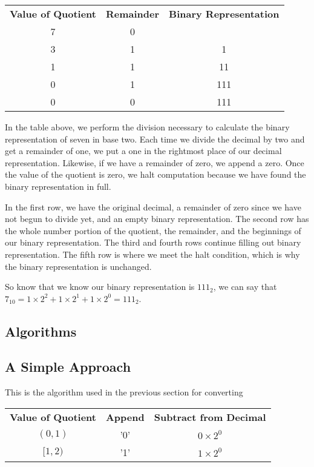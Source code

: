 \documentclass[12pt]{article}
\begin{document}
\begin{center}
\begin{tabular}{c|c|c}
  \textbf{Value of Quotient} & \textbf{Remainder} & \textbf{Binary Representation} \\
  7 & 0 & \\
  3 & 1 & 1 \\
  1 & 1 & 11 \\
  0 & 1 & 111 \\
  0 & 0 & 111
\end{tabular}
\end{center}

\par In the table above, we perform the division necessary to calculate the binary representation of seven in base two. Each time we divide the decimal by two and get a remainder of one, we put a one in the rightmost place of our decimal representation. Likewise, if we have a remainder of zero, we append a zero. Once the value of the quotient is zero, we halt computation because we have found the binary representation in full.

\par In the first row, we have the original decimal, a remainder of zero since we have not begun to divide yet, and an empty binary representation. The second row has the whole number portion of the quotient, the remainder, and the beginnings of our binary representation. The third and fourth rows continue filling out binary representation. The fifth row is where we meet the halt condition, which is why the binary representation is unchanged.

\par So know that we know our binary representation is $111_2$, we can say that $7_{10} = 1\times2^2+1\times2^1+1\times2^0 = 111_2$.



\newpage %



\begin{center}
\section{Algorithms}
\end{center}
\subsection{A Simple Approach}
This is the algorithm used in the previous section for converting
\begin{center}
\begin{tabular}{c|c|c}
    \textbf{Value of Quotient} & \textbf{Append} & \textbf{Subtract from Decimal} \\
    $(0,1)$   & '0' & $0\times2^0$ \\
    $[1,2)$   & '1' & $1\times2^0$
\end{tabular}
\end{center}
\end{document}
